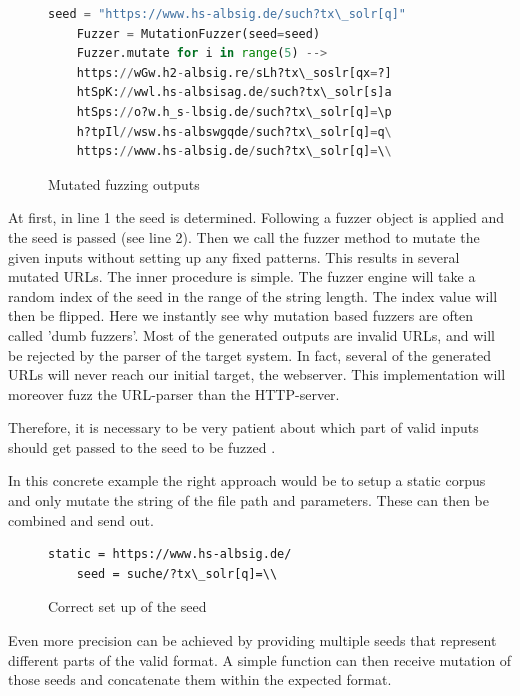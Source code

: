\documentclass[journal=tosc,final]{iacrtrans}
\begin{document}
\begin{figure}[h]
\caption{Mutated fuzzing outputs}
 \begin{lstlisting}[language=python,style=code]
	seed = "https://www.hs-albsig.de/such?tx\_solr[q]"
	Fuzzer = MutationFuzzer(seed=seed)
	Fuzzer.mutate for i in range(5) -->
	https://wGw.h2-albsig.re/sLh?tx\_soslr[qx=?]
	htSpK://wwl.hs-albsisag.de/such?tx\_solr[s]a
	htSps://o?w.h_s-lbsig.de/such?tx\_solr[q]=\p
	h?tpIl//wsw.hs-albswgqde/such?tx\_solr[q]=q\
	https://www.hs-albsig.de/such?tx\_solr[q]=\\
\end{lstlisting}

\end{figure}
At first, in line 1 the seed is determined. Following a fuzzer object is applied and the seed is passed (see line 2). Then we call the fuzzer method to mutate the given inputs without setting up any fixed patterns. This results in several mutated URLs. The inner procedure is simple. The fuzzer engine will take a random index of the seed in the range of the string length. The index value will then be flipped.  Here we instantly see why mutation based fuzzers are often called 'dumb fuzzers'. 
Most of the generated outputs are invalid URLs, and will be rejected by the parser of the target system. In fact, several of the generated URLs will never reach our initial target, the webserver. This implementation will moreover fuzz the URL-parser than the HTTP-server.


Therefore, it is necessary to be very patient about which part of valid inputs should get passed to the seed to be fuzzed \cite{fuzz}. 

In this concrete example the right approach would be to setup a  static corpus and only mutate the string of the file path and parameters. 
These can then be combined and send out.


\begin{figure}[h]
 \caption{Correct set up of the seed}
 \begin{lstlisting}[style=code]
	static = https://www.hs-albsig.de/  
	seed = suche/?tx\_solr[q]=\\
 \end{lstlisting}
\end{figure}


Even more precision can be achieved by providing multiple seeds that represent different parts of the valid format. A simple function can then receive mutation of those seeds and concatenate them within the expected format.
\end{document}
